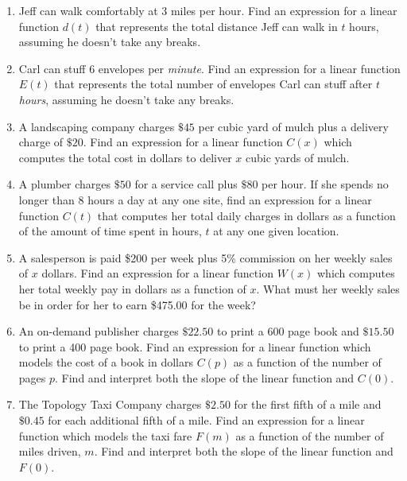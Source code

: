 \begin{enumerate}

\setcounter{enumi}{\value{HW}}


\item  Jeff can walk comfortably at $3$ miles per hour.  Find an expression for a linear function $d(t)$ that represents the total distance Jeff can walk in $t$ hours, assuming he doesn't take any breaks.

\item  Carl can stuff $6$ envelopes per \textit{minute}.  Find an expression for a linear function $E(t)$ that represents the total number of envelopes Carl can stuff after $t$ \textit{hours}, assuming he doesn't take any breaks.

\item  A landscaping company charges $\$45$ per cubic yard of mulch plus a delivery charge of $\$20$.  Find an expression for a  linear function $C(x)$ which computes the total cost in dollars  to deliver $x$ cubic yards of mulch.

\item  A plumber charges $\$50$ for a service call plus $\$80$ per hour.  If she spends no longer than 8 hours a day at any one site, find an expression for a  linear function $C(t)$ that computes her total daily charges in dollars as a function of the amount of time spent in hours, $t$  at any one given location.

\item A salesperson is paid \$200 per week plus 5\% commission on her weekly sales of $x$ dollars.  Find an expression for a  linear function $W(x)$ which computes her total weekly pay in dollars as a function of $x$.  What must her weekly sales be in order for her to earn \$475.00 for the week?


\item  An on-demand publisher charges $\$22.50$ to print a 600 page book and $\$15.50$ to print a 400 page book.  Find an expression for a linear function which models the cost of a book in dollars $C(p)$ as a function of the number of pages $p$.  Find and interpret both the slope of the linear function  and $C(0)$.

\item The Topology Taxi Company charges $\$2.50$ for the first fifth of a mile and $\$0.45$ for each additional fifth of a mile.  Find an expression for a  linear function which models the taxi fare $F(m)$ as a function of the number of miles driven, $m$.  Find and interpret both the slope of the linear function  and $F(0)$.


\end{enumerate}
